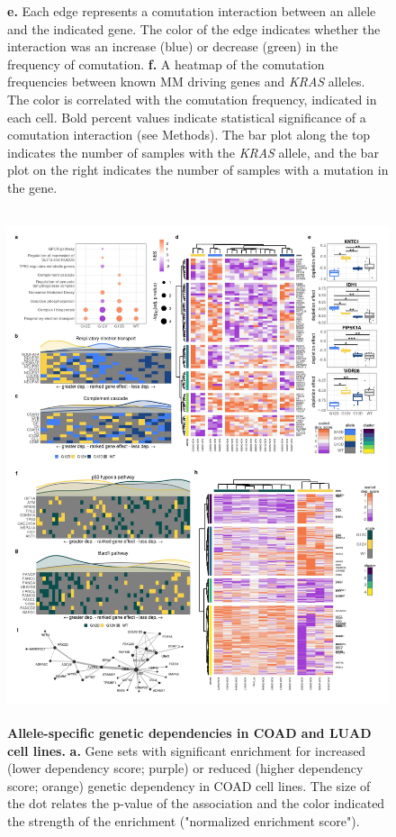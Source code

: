 \documentclass[english, 10pt, letterpaper]{article}
\newcommand{\KRAS}{\emph{KRAS}}
\begin{document}
\begin{figure}[p]
{    \textbf{e.} Each edge represents a comutation interaction between an allele and the indicated gene. The color of the edge indicates whether the interaction was an increase (blue) or decrease (green) in the frequency of comutation.
    \textbf{f.} A heatmap of the comutation frequencies between known MM driving genes and \KRAS{} alleles. The color is correlated with the comutation frequency, indicated in each cell. Bold percent values indicate statistical significance of a comutation interaction (see Methods). The bar plot along the top indicates the number of samples with the \KRAS{} allele, and the bar plot on the right indicates the number of samples with a mutation in the gene.
}
\label{fig:luadmm-comutation-main}
\end{figure}


\begin{figure}[p]
\centering
\includegraphics[height=150mm]{figures/Figure_04.jpeg}
\caption{
    \textbf{Allele-specific genetic dependencies in COAD and LUAD cell lines.}
    \textbf{a.} Gene sets with significant enrichment for increased (lower dependency score; purple) or reduced (higher dependency score; orange) genetic dependency in COAD cell lines. The size of the dot relates the p-value of the association and the color indicated the strength of the enrichment ("normalized enrichment score").
}
\end{figure}
\end{document}
